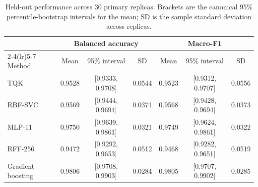 \begin{table}[t]
\caption{Held-out performance across 30 primary replicas. Brackets are the canonical 95\% percentile-bootstrap intervals for the mean; SD is the sample standard deviation across replicas.}
\label{tab:main-performance}
\centering
\small
\setlength{\tabcolsep}{5pt}
\begin{tabular}{lcccccc}
\toprule
& \multicolumn{3}{c}{Balanced accuracy} & \multicolumn{3}{c}{Macro-F1} \\
\cmidrule(lr){2-4}\cmidrule(lr){5-7}
Method & Mean & 95\% interval & SD & Mean & 95\% interval & SD \\
\midrule
TQK & 0.9528 & [0.9333, 0.9708] & 0.0544 & 0.9523 & [0.9312, 0.9707] & 0.0556 \\
RBF-SVC & 0.9569 & [0.9444, 0.9694] & 0.0371 & 0.9568 & [0.9428, 0.9694] & 0.0373 \\
MLP-11 & 0.9750 & [0.9639, 0.9861] & 0.0321 & 0.9749 & [0.9624, 0.9861] & 0.0322 \\
RFF-256 & 0.9472 & [0.9292, 0.9653] & 0.0512 & 0.9468 & [0.9282, 0.9651] & 0.0519 \\
Gradient boosting & 0.9806 & [0.9708, 0.9903] & 0.0284 & 0.9805 & [0.9707, 0.9902] & 0.0285 \\
\bottomrule
\end{tabular}
\end{table}
